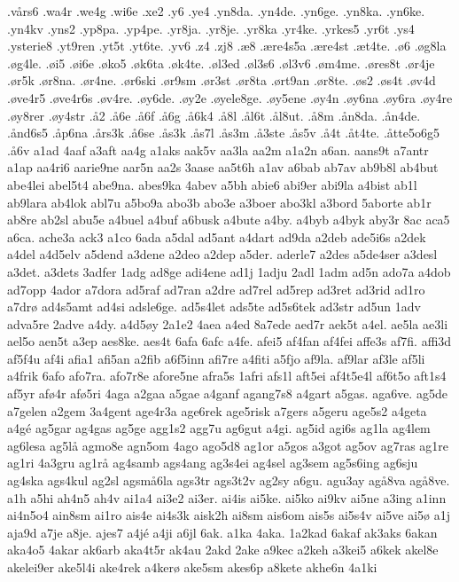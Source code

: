 {.vårs6
.wa4r
.we4g
.wi6e
.xe2
.y6
.ye4
.yn8da.
.yn4de.
.yn6ge.
.yn8ka.
.yn6ke.
.yn4kv
.yns2
.yp8pa.
.yp4pe.
.yr8ja.
.yr8je.
.yr8ka
.yr4ke.
.yrkes5
.yr6t
.ys4
.ysterie8
.yt9ren
.yt5t
.yt6te.
.yv6
.z4
.zj8
.æ8
.ære4s5a
.ære4st
.æt4te.
.ø6
.øg8la
.øg4le.
.øi5
.øi6e
.øko5
.øk6ta
.øk4te.
.øl3ed
.øl3s6
.øl3v6
.øm4me.
.øres8t
.ør4je
.ør5k
.ør8na.
.ør4ne.
.ør6ski
.ør9sm
.ør3st
.ør8ta
.ørt9an
.ør8te.
.øs2
.øs4t
.øv4d
.øve4r5
.øve4r6s
.øv4re.
.øy6de.
.øy2e
.øyele8ge.
.øy5ene
.øy4n
.øy6na
.øy6ra
.øy4re
.øy8rer
.øy4str
.å2
.å6e
.å6f
.å6g
.å6k4
.å8l
.ål6t
.ål8ut.
.å8m
.ån8da.
.ån4de.
.ånd6s5
.åp6na
.års3k
.å6se
.ås3k
.ås7l
.ås3m
.å3ste
.ås5v
.å4t
.åt4te.
.åtte5o6g5
.å6v
a1ad
4aaf
a3aft
aa4g
a1aks
aak5v
aa3la
aa2m
a1a2n
a6an.
aans9t
a7antr
a1ap
aa4ri6
aarie9ne
aar5n
aa2s
3aase
aa5t6h
a1av
a6bab
ab7av
ab9b8l
ab4but
abe4lei
abel5t4
abe9na.
abes9ka
4abev
a5bh
abie6
abi9er
abi9la
a4bist
ab1l
ab9lara
ab4lok
abl7u
a5bo9a
abo3b
abo3e
a3boer
abo3kl
a3bord
5aborte
ab1r
ab8re
ab2sl
abu5e
a4buel
a4buf
a6busk
a4bute
a4by.
a4byb
a4byk
aby3r
8ac
aca5
a6ca.
ache3a
ack3
a1co
6ada
a5dal
ad5ant
a4dart
ad9da
a2deb
ade5i6s
a2dek
a4del
a4d5elv
a5dend
a3dene
a2deo
a2dep
a5der.
aderle7
a2des
a5de4ser
a3desl
a3det.
a3dets
3adfer
1adg
ad8ge
adi4ene
ad1j
1adju
2adl
1adm
ad5n
ado7a
a4dob
ad7opp
4ador
a7dora
ad5raf
ad7ran
a2dre
ad7rel
ad5rep
ad3ret
ad3rid
ad1ro
a7drø
ad4s5amt
ad4si
adsle6ge.
ad5s4let
ads5te
ad5s6tek
ad3str
ad5un
1adv
adva5re
2adve
a4dy.
a4d5øy
2a1e2
4aea
a4ed
8a7ede
aed7r
aek5t
a4el.
ae5la
ae3li
ael5o
aen5t
a3ep
aes8ke.
aes4t
6afa
6afc
a4fe.
afei5
af4fan
af4fei
affe3s
af7fi.
affi3d
af5f4u
af4i
afia1
afi5an
a2fib
a6f5inn
afi7re
a4fiti
a5fjo
af9la.
af9lar
af3le
af5li
a4frik
6afo
afo7ra.
afo7r8e
afore5ne
afra5s
1afri
afs1l
aft5ei
af4t5e4l
af6t5o
aft1s4
af5yr
afø4r
afø5ri
4aga
a2gaa
a5gae
a4ganf
agang7s8
a4gart
a5gas.
aga6ve.
ag5de
a7gelen
a2gem
3a4gent
age4r3a
age6rek
age5risk
a7gers
a5geru
age5s2
a4geta
a4gé
ag5gar
ag4gas
ag5ge
agg1s2
agg7u
ag6gut
a4gi.
ag5id
agi6s
ag1la
ag4lem
ag6lesa
ag5lå
agmo8e
agn5om
4ago
ago5d8
ag1or
a5gos
a3got
ag5ov
ag7ras
ag1re
ag1ri
4a3gru
ag1rå
ag4samb
ags4ang
ag3s4ei
ag4sel
ag3sem
ag5s6ing
ag6sju
ag4ska
ags4kul
ag2sl
agsmå6la
ags3tr
ags3t2v
ag2sy
a6gu.
agu3ay
agå8va
agå8ve.
a1h
a5hi
ah4n5
ah4v
ai1a4
ai3e2
ai3er.
ai4is
ai5ke.
ai5ko
ai9kv
ai5ne
a3ing
a1inn
ai4n5o4
ain8sm
ai1ro
ais4e
ai4s3k
aisk2h
ai8sm
ais6om
ais5s
ai5s4v
ai5ve
ai5ø
a1j
aja9d
a7je
a8je.
ajes7
a4jé
a4ji
a6jl
6ak.
a1ka
4aka.
1a2kad
6akaf
ak3aks
6akan
aka4o5
4akar
ak6arb
aka4t5r
ak4au
2akd
2ake
a9kec
a2keh
a3kei5
a6kek
akel8e
akelei9er
ake5l4i
ake4rek
a4kerø
ake5sm
akes6p
a8kete
akhe6n
4a1ki
}
